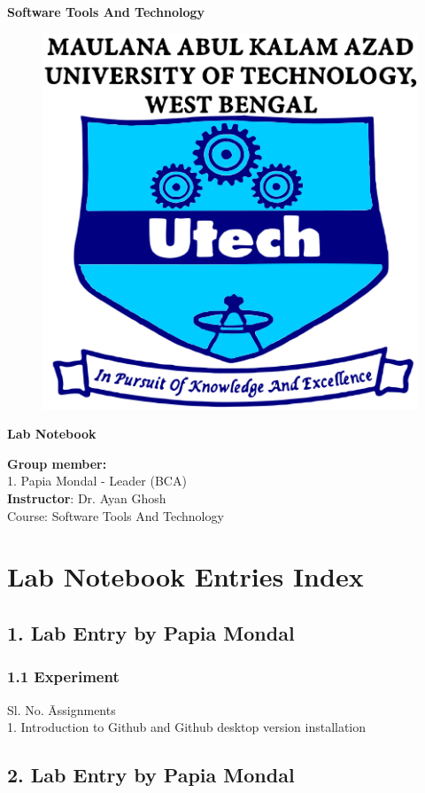 \documentclass[a4paper,12pt]{article}
\begin{document}
\begin{center}
    \Large \textbf{Software Tools And Technology} \\[1cm]
\begin{figure}[h!]
   \centering
    \includegraphics[width=0.3\linewidth]{makaut logo.png}
\end{figure}
\vspace{0.5 cm}
    
    \textbf{Lab Notebook} \\[2cm]

    \vspace{0.1 cm}

    
    \textbf{Group member:} \\[0.5cm]
    1. Papia Mondal - Leader (BCA) \\[0.2cm]
    \vspace{0.5 cm}
    \textbf{Instructor}: Dr. Ayan Ghosh \\[0.5cm]
    Course: Software Tools And Technology
\end{center}
\newpage
\section*{Lab Notebook Entries Index}

\subsection*{1. Lab Entry by Papia Mondal}
\subsubsection*{1.1 Experiment}
\begin{tabbing}
    Sl. No. \hspace{2cm} \= Assignments \\
    1. \> Introduction to Github and Github desktop version installation \\
\end{tabbing}

\subsection*{2. Lab Entry by Papia Mondal}
\end{document}

